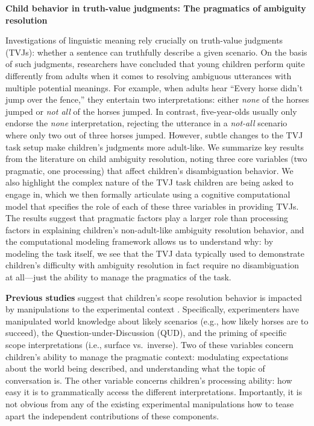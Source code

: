 \documentclass[12pt]{article}
\newcommand{\lsp}[1]{\textcolor{violet}{[lsp: #1]}}
\begin{document}
\begin{center}
\textbf{Child behavior in truth-value judgments: The pragmatics of ambiguity resolution}
\end{center}

Investigations of linguistic meaning rely crucially on truth-value judgments {({TVJs})}: whether a sentence can truthfully describe a given scenario. On the basis of such judgments, researchers have concluded that young children perform quite differently from adults when it comes to 
{resolving}
ambiguous utterances with multiple potential meanings. For example, when adults hear ``Every horse didn't jump over the fence,'' they entertain two interpretations: either {\textit{none}} of the horses jumped or {\textit{not all}} of the horses jumped. {In contrast, five-year-olds}
usually only endorse the {\textit{none}} interpretation, rejecting the utterance in a {\textit{not-all}}
scenario where only two out of three horses jumped. However, subtle changes to the 
{TVJ} task setup make children{'s judgments} more adult-like. We summarize key results from the literature on child ambiguity resolution, noting three core variables {(two pragmatic, one processing)} that affect children's disambiguation behavior. We also highlight the {complex} nature of the 
{TVJ}
task children are being asked to engage in, which we then formally articulate using a cognitive computational model that specifies the role of each of these three variables in providing 
{TVJs}.
The results suggest that pragmatic factors play a larger role than processing factors in explaining children's non-adult-like ambiguity resolution behavior, and the computational modeling framework allows us to understand why: by modeling the task itself, we see that the 
{TVJ}
data typically used to demonstrate children's difficulty with ambiguity {resolution} in fact require no disambiguation at all---just the ability to manage the pragmatics of the task. 

\textbf{Previous studies} suggest that children's scope resolution behavior is impacted by manipulations to the experimental context \cite{MuLid2006,viau2010priming,gualmini2008question,gualmini2008rise}. Specifically, experimenters have manipulated world knowledge about likely scenarios (e.g., how likely horses are to succeed), the Question-under-Discussion (QUD), and the priming of specific scope interpretations (i.e., surface vs.~inverse).  
{Two of these} variables concern children's ability to manage the pragmatic context: 
modulating expectations about the world being described, and
understanding what the topic of conversation is.
{The other}
variable concerns children's processing ability: how easy it is to grammatically access the different interpretations. 
Importantly, it is not obvious from any of the existing experimental manipulations how to tease apart the independent contributions of these components. 
\end{document}
